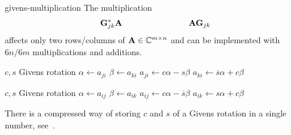 \begin{Algorithm}{givens-multiplication}
  The multiplication
  \begin{gather}
    \mathbf G_{jk}^*\mathbf A\qquad\qquad\qquad\qquad \mathbf A\mathbf G_{jk}
  \end{gather}
  affects only two rows/columns of $\mathbf A\in\mathbb C^{m\times n}$ and can be
  implemented with $6n/6m$ multiplications and additions.

  \hrulefill
  \vspace*{2mm}

  \begin{minipage}{.49\textwidth}
    \begin{algorithmic}[1]
      \Require $c,s$ Givens rotation
      \State $\alpha \gets a_{ji}$
      \State $\beta \gets a_{ki}$
      \State $a_{ji} \gets c\alpha-s\beta$
      \State $a_{ki} \gets \overline{s}\alpha+c\beta$
      \EndFor
    \end{algorithmic}
  \end{minipage}
  \begin{minipage}{.49\textwidth}
    \begin{algorithmic}[1]
      \Require $c,s$ Givens rotation
      \State $\alpha \gets a_{ij}$
      \State $\beta \gets a_{ik}$
      \State $a_{ij} \gets c\alpha-\overline{s}\beta$
      \State $a_{ik} \gets s\alpha+c\beta$
      \EndFor
    \end{algorithmic}
  \end{minipage}
\end{Algorithm}

\begin{remark}
  There is a compressed way of storing $c$ and $s$ of a Givens
  rotation in a single number, see~\cite[5.1.11]{GolubVanLoan83}.
\end{remark}



